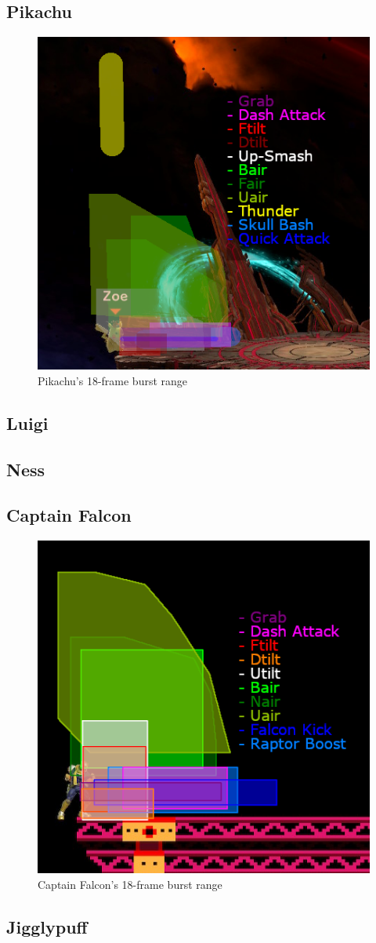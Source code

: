 \begin{multicols}{2}
\subsection{Pikachu}
\begin{figure}[H]
    \centering
    \includegraphics[width=.45\textwidth]{images/burst-ranges/pika}
    \caption{Pikachu's 18-frame burst range\cite{ref:burst-range:pika}}
\end{figure}

\subsection{Luigi}
\subsection{Ness}
\subsection{Captain Falcon}
\begin{figure}[H]
    \centering
    \includegraphics[width=.45\textwidth]{images/burst-ranges/falcon}
    \caption{Captain Falcon's 18-frame burst range\cite{ref:burst-range:falcon}}
\end{figure}

\subsection{Jigglypuff}

\end{multicols}

